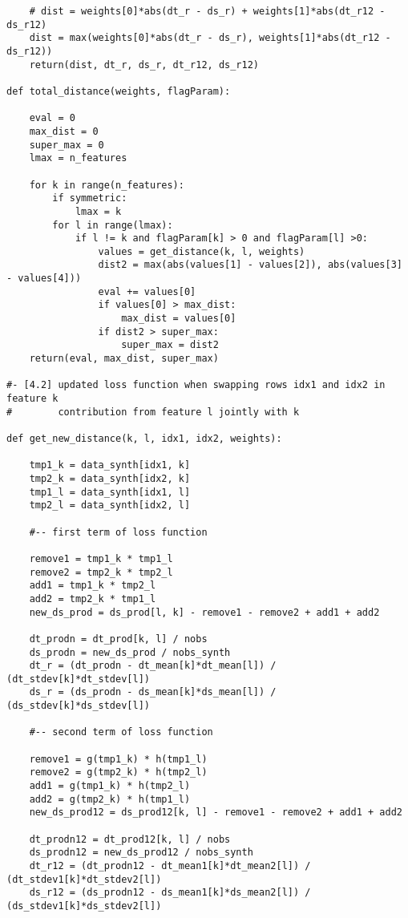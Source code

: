 \documentclass[oneside,10pt]{book}
\begin{document}
\begin{lstlisting}
    # dist = weights[0]*abs(dt_r - ds_r) + weights[1]*abs(dt_r12 - ds_r12)
    dist = max(weights[0]*abs(dt_r - ds_r), weights[1]*abs(dt_r12 - ds_r12))
    return(dist, dt_r, ds_r, dt_r12, ds_r12)

def total_distance(weights, flagParam):

    eval = 0
    max_dist = 0
    super_max = 0
    lmax = n_features

    for k in range(n_features):
        if symmetric:
            lmax = k
        for l in range(lmax):
            if l != k and flagParam[k] > 0 and flagParam[l] >0:
                values = get_distance(k, l, weights)
                dist2 = max(abs(values[1] - values[2]), abs(values[3] - values[4]))
                eval += values[0]
                if values[0] > max_dist:
                    max_dist = values[0]
                if dist2 > super_max:
                    super_max = dist2
    return(eval, max_dist, super_max)

#- [4.2] updated loss function when swapping rows idx1 and idx2 in feature k
#        contribution from feature l jointly with k

def get_new_distance(k, l, idx1, idx2, weights):

    tmp1_k = data_synth[idx1, k]
    tmp2_k = data_synth[idx2, k]
    tmp1_l = data_synth[idx1, l]
    tmp2_l = data_synth[idx2, l]

    #-- first term of loss function

    remove1 = tmp1_k * tmp1_l
    remove2 = tmp2_k * tmp2_l
    add1 = tmp1_k * tmp2_l
    add2 = tmp2_k * tmp1_l
    new_ds_prod = ds_prod[l, k] - remove1 - remove2 + add1 + add2

    dt_prodn = dt_prod[k, l] / nobs
    ds_prodn = new_ds_prod / nobs_synth
    dt_r = (dt_prodn - dt_mean[k]*dt_mean[l]) / (dt_stdev[k]*dt_stdev[l])
    ds_r = (ds_prodn - ds_mean[k]*ds_mean[l]) / (ds_stdev[k]*ds_stdev[l])

    #-- second term of loss function

    remove1 = g(tmp1_k) * h(tmp1_l)
    remove2 = g(tmp2_k) * h(tmp2_l)
    add1 = g(tmp1_k) * h(tmp2_l)
    add2 = g(tmp2_k) * h(tmp1_l)
    new_ds_prod12 = ds_prod12[k, l] - remove1 - remove2 + add1 + add2

    dt_prodn12 = dt_prod12[k, l] / nobs
    ds_prodn12 = new_ds_prod12 / nobs_synth
    dt_r12 = (dt_prodn12 - dt_mean1[k]*dt_mean2[l]) / (dt_stdev1[k]*dt_stdev2[l])
    ds_r12 = (ds_prodn12 - ds_mean1[k]*ds_mean2[l]) / (ds_stdev1[k]*ds_stdev2[l])


\end{lstlisting}
\end{document}
